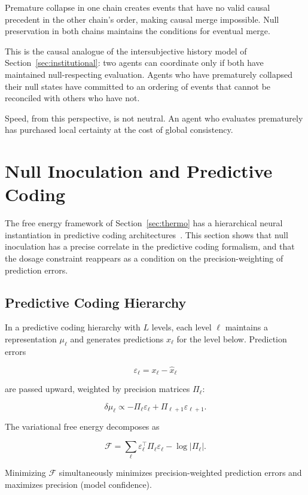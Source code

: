 \documentclass[11pt]{article}
\theoremstyle{remark}
\begin{document}
Premature collapse in one chain creates events that have no valid causal precedent in the other chain's order, making causal merge impossible. Null preservation in both chains maintains the conditions for eventual merge.

This is the causal analogue of the intersubjective history model of Section~\ref{sec:institutional}: two agents can coordinate only if both have maintained null-respecting evaluation. Agents who have prematurely collapsed their null states have committed to an ordering of events that cannot be reconciled with others who have not.

Speed, from this perspective, is not neutral. An agent who evaluates prematurely has purchased local certainty at the cost of global consistency.

\section{Null Inoculation and Predictive Coding}
\label{sec:predictive_coding}

The free energy framework of Section~\ref{sec:thermo} has a hierarchical neural instantiation in predictive coding architectures~\cite{friston}. This section shows that null inoculation has a precise correlate in the predictive coding formalism, and that the dosage constraint reappears as a condition on the precision-weighting of prediction errors.

\subsection{Predictive Coding Hierarchy}

In a predictive coding hierarchy with $L$ levels, each level $\ell$ maintains a representation $\mu_\ell$ and generates predictions $\hat{x}_\ell$ for the level below. Prediction errors

\[
\varepsilon_\ell = x_\ell - \hat{x}_\ell
\]

are passed upward, weighted by precision matrices $\Pi_\ell$:

\[
\delta\mu_\ell \propto -\Pi_\ell \varepsilon_\ell + \Pi_{\ell+1}\varepsilon_{\ell+1}.
\]

The variational free energy decomposes as

\[
\mathcal{F} = \sum_\ell \varepsilon_\ell^\top \Pi_\ell \varepsilon_\ell - \log |\Pi_\ell|.
\]

Minimizing $\mathcal{F}$ simultaneously minimizes precision-weighted prediction errors and maximizes precision (model confidence).
\end{document}
